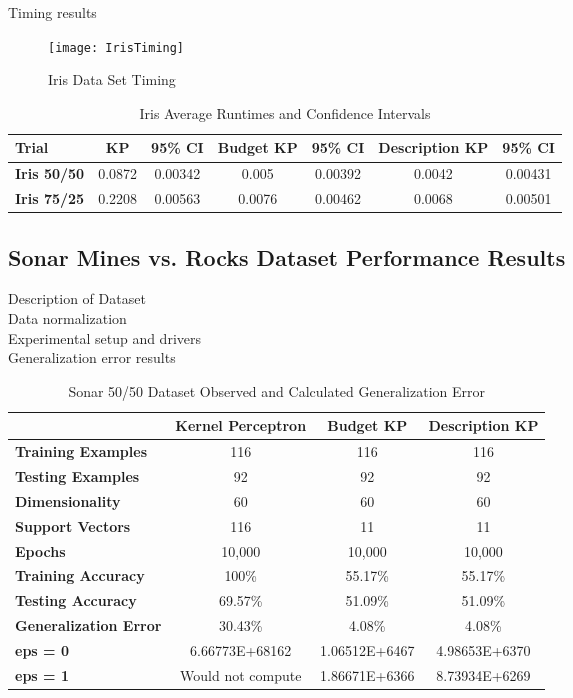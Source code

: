 Timing results

\begin{figure}[h]\label{IrisTiming}
 \caption{Iris Data Set Timing}
 \texttt{[image: IrisTiming]}
\end{figure}

\begin{table}[h!]
 \begin{center}
  \caption{Iris Average Runtimes and Confidence Intervals}
  \label{tab:iristabtiming}
  \begin{tabular}{l|c|c|c|c|c|c}
  \textbf{Trial} & \textbf{KP} & \textbf{95\% CI} & \textbf{Budget KP} & \textbf{95\% CI} & \textbf{Description KP} & \textbf{95\% CI}\\
  \hline
  \textbf{Iris 50/50} & 0.0872 & 0.00342 & 0.005 & 0.00392 & 0.0042 & 0.00431\\
  \textbf{Iris 75/25} & 0.2208 & 0.00563 & 0.0076 & 0.00462 & 0.0068 & 0.00501\\
  \end{tabular}
 \end{center}
\end{table}

\subsection{Sonar Mines vs. Rocks Dataset Performance Results}\label{SonarResults}
Description of Dataset
\\Data normalization
\\Experimental setup and drivers
\\Generalization error results

\begin{table}[h!]
 \begin{center}
  \caption{Sonar 50/50 Dataset Observed and Calculated Generalization Error}
  \label{tab:sonar50gencalc}
  \begin{tabular}{l|c|c|c}
  \textbf{ } & \textbf{Kernel Perceptron} & \textbf{Budget KP} & \textbf{Description KP}\\
  \hline
  \textbf{Training Examples} & 116 & 116 & 116\\
  \textbf{Testing Examples} & 92 & 92 & 92\\
  \textbf{Dimensionality} & 60 & 60 & 60\\
  \textbf{Support Vectors} & 116 & 11 & 11\\
  \textbf{Epochs} & 10,000 & 10,000 & 10,000\\
  \hline
  \textbf{Training Accuracy} & 100\% & 55.17\% & 55.17\%\\
  \textbf{Testing Accuracy} & 69.57\% & 51.09\% & 51.09\%\\
  \textbf{Generalization Error} & 30.43\% & 4.08\% & 4.08\%\\
  \hline
  \textbf{eps = 0} & 6.66773E+68162 & 1.06512E+6467 & 4.98653E+6370\\
  \textbf{eps = 1} & Would not compute & 1.86671E+6366 & 8.73934E+6269\\
  \end{tabular}
 \end{center}
\end{table}

